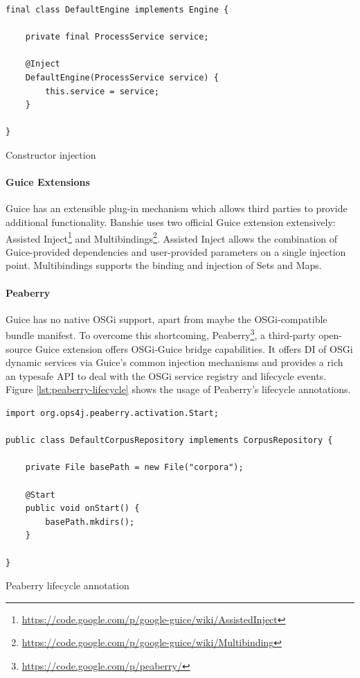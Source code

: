 \begin{listing}[H]
\begin{verbatim}
final class DefaultEngine implements Engine {

    private final ProcessService service;

    @Inject
    DefaultEngine(ProcessService service) {
        this.service = service;
    }

}
\end{verbatim}
\caption{Constructor injection}
\end{listing}

\paragraph{Guice Extensions}
Guice has an extensible plug-in mechanism which allows third parties to provide additional functionality. Banshie uses two official Guice extension extensively: Assisted Inject\footnote{\url{https://code.google.com/p/google-guice/wiki/AssistedInject}} and Multibindings\footnote{\url{https://code.google.com/p/google-guice/wiki/Multibinding}}. Assisted Inject allows the combination of Guice-provided dependencies and user-provided parameters on a single injection point. Multibindings supports the binding and injection of Sets and Maps.

\paragraph{Peaberry}
Guice has no native OSGi support, apart from maybe the OSGi-compatible bundle manifest. To overcome this shortcoming, Peaberry\footnote{\url{https://code.google.com/p/peaberry/}}, a third-party open-source Guice extension offers OSGi-Guice bridge capabilities. It offers \gls{DI} of OSGi dynamic services via Guice's common injection mechanisms and provides a rich an typesafe API to deal with the OSGi service registry and lifecycle events. Figure \ref{lst:peaberry-lifecycle} shows the usage of Peaberry's lifecycle annotations.

\begin{listing}[H]
\begin{verbatim}
import org.ops4j.peaberry.activation.Start;

public class DefaultCorpusRepository implements CorpusRepository {

    private File basePath = new File("corpora");

    @Start
    public void onStart() {
        basePath.mkdirs();
    }

}
\end{verbatim}
\caption{Peaberry lifecycle annotation}
\label{lst:peaberry-lifecycle}
\end{listing}

